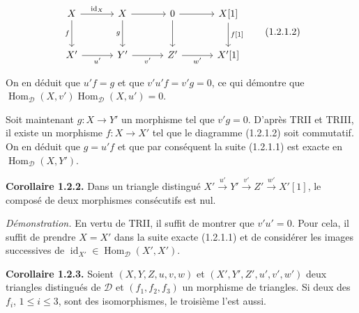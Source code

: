 \begin{equation}
  \begin{tikzcd}[column sep=3.2em,row sep=2.5em]
    X \arrow[r,"{\operatorname{id}_X}"] \arrow[d,"f"']
      & X \arrow[r] \arrow[d,"g"']
      & 0 \arrow[r] \arrow[d]
      & X[1] \arrow[d,"{f[1]}"] \\
    X' \arrow[r,"u'"']
      & Y' \arrow[r,"v'"']
      & Z' \arrow[r,"w'"']
      & X'[1]
  \end{tikzcd}
  \tag{1.2.1.2}
\end{equation}

On en déduit que $u'f=g$ et que $v'u'f=v'g=0$, ce qui démontre que
$\operatorname{Hom}_{\mathcal D}(X,v')
\operatorname{Hom}_{\mathcal D}(X,u')=0$.

Soit maintenant $g\colon X\longrightarrow Y'$ un morphisme tel que
$v'g=0$. D'après TRII et TRIII, il existe un morphisme
$f\colon X\longrightarrow X'$ tel que le diagramme (1.2.1.2) soit
commutatif. On en déduit que $g=u'f$ et que par conséquent la suite
(1.2.1.1) est exacte en $\operatorname{Hom}_{\mathcal D}(X,Y')$.

\medskip
\noindent\textbf{Corollaire 1.2.2.}\quad
Dans un triangle distingué
$X'\xrightarrow{u'}Y'\xrightarrow{v'}Z'\xrightarrow{w'}X'[1]$, le composé
de deux morphismes consécutifs est nul.

\noindent\emph{Démonstration.}\quad
En vertu de TRII, il suffit de montrer que $v'u'=0$. Pour cela, il suffit de
prendre $X=X'$ dans la suite exacte (1.2.1.1) et de considérer les images
successives de
$\operatorname{id}_{X'}\in\operatorname{Hom}_{\mathcal D}(X',X')$.

\medskip
\noindent\textbf{Corollaire 1.2.3.}\quad
Soient $(X,Y,Z,u,v,w)$ et $(X',Y',Z',u',v',w')$ deux triangles distingués
de $\mathcal D$ et $(f_1,f_2,f_3)$ un morphisme de triangles. Si deux des
$f_i$, $1\leq i\leq3$, sont des isomorphismes, le troisième l'est aussi.
\endgroup

